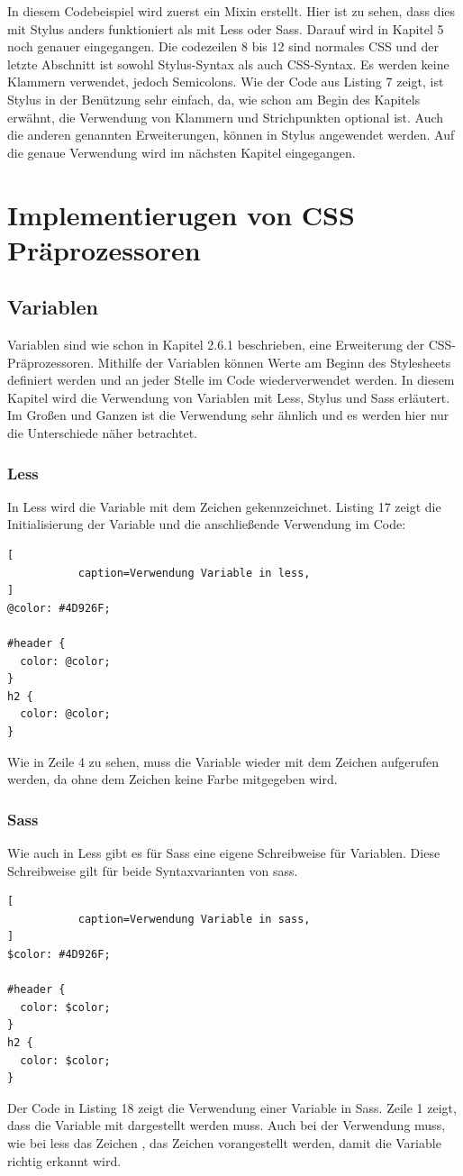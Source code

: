 In diesem Codebeispiel wird zuerst ein Mixin erstellt. Hier ist zu sehen, dass dies mit Stylus anders funktioniert als mit Less oder Sass. Darauf wird in Kapitel 5 noch genauer eingegangen.\newline
Die codezeilen 8 bis 12 sind normales CSS und der letzte Abschnitt ist sowohl Stylus-Syntax als auch CSS-Syntax. Es werden keine Klammern verwendet, jedoch Semicolons.\newline
Wie der Code aus Listing 7 zeigt, ist Stylus in der Benützung sehr einfach, da, wie schon am Begin des Kapitels erwähnt, die Verwendung von Klammern und Strichpunkten optional ist. Auch die anderen genannten Erweiterungen, können in Stylus angewendet werden.\newline
Auf die genaue Verwendung wird im nächsten Kapitel eingegangen.

\section{Implementierugen von CSS Präprozessoren}
\subsection{Variablen}
Variablen sind wie schon in Kapitel 2.6.1 beschrieben, eine Erweiterung der CSS-Präprozessoren. Mithilfe der Variablen können Werte am Beginn des Stylesheets definiert werden und an jeder Stelle im Code wiederverwendet werden. In diesem Kapitel wird die Verwendung von Variablen mit Less, Stylus und Sass erläutert. Im Großen und Ganzen ist die Verwendung sehr ähnlich und es werden hier nur die Unterschiede näher betrachtet.
\subsubsection{Less}
In Less wird die Variable mit dem Zeichen \grqq{} gekennzeichnet. Listing 17 zeigt die Initialisierung der Variable und die anschließende Verwendung im Code:
\begin{lstlisting}[
           caption=Verwendung Variable in less,
]
@color: #4D926F;

#header {
  color: @color;
}
h2 {
  color: @color;
}
\end{lstlisting}
Wie in Zeile 4 zu sehen, muss die Variable wieder mit dem \grqq{} Zeichen aufgerufen werden, da ohne dem  \glqq{} Zeichen keine Farbe mitgegeben wird.
\subsubsection{Sass}
Wie auch in Less gibt es für Sass eine eigene Schreibweise für Variablen. Diese Schreibweise gilt für beide Syntaxvarianten von sass.
\begin{lstlisting}[
           caption=Verwendung Variable in sass,
]
$color: #4D926F;

#header {
  color: $color;
}
h2 {
  color: $color;
}
\end{lstlisting}
Der Code in Listing 18 zeigt die Verwendung einer Variable in Sass. Zeile 1 zeigt, dass die Variable mit \glqq{\$}\grqq{} dargestellt werden muss. Auch bei der Verwendung muss, wie bei less das Zeichen \grqq{}, das Zeichen \glqq{\$}\grqq{} vorangestellt werden, damit die Variable richtig erkannt wird.
